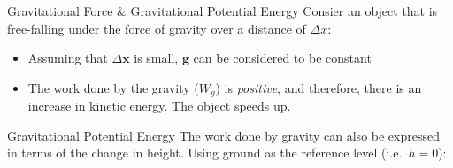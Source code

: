 \documentclass[12pt,compress,aspectratio=169]{beamer}
\begin{document}
\begin{frame}{Gravitational Force \& Gravitational Potential Energy}
  Consier an object that is free-falling under the force of gravity over a
  distance of $\Delta x$:
  \begin{center}
  \end{center}
  \begin{itemize}
  \item Assuming that $\Delta\bm x$ is small, $\bm g$ can be considered to be
    constant
  \item The work done by the gravity ($W_g$) is \emph{positive}, and
    therefore, there is an increase in kinetic energy. The object speeds up.

  \end{itemize}
\end{frame}



\begin{frame}{Gravitational Potential Energy}
  The work done by gravity can also be expressed in terms of the change in
  height. Using ground as the reference level (i.e.\ $h=0$):
  \begin{center}
  \end{center} 

  \vspace{-.3in}{\Large
    \begin{align*}
      W_g
      &= mg(h_2-h_1)\\
      &= -mg(h_2-h_1)=-(mgh_2-mgh_1)
    \end{align*}
  }


\end{frame}
\end{document}
